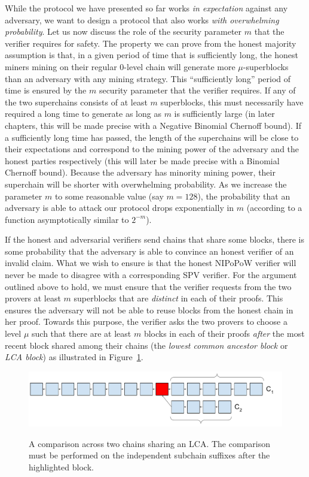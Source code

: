 While the protocol we have presented so far works \emph{in expectation} against
any adversary, we want to design a protocol that also works \emph{with
overwhelming probability}.  Let us now discuss the role of the security
parameter $m$ that the verifier requires for safety. The property we can prove
from the honest majority assumption is that, in a given period of time that is
sufficiently long, the honest miners mining on their regular $0$-level chain
will generate more $\mu$-superblocks than an adversary with any mining strategy.
This ``sufficiently long'' period of time is ensured by the $m$ security
parameter that the verifier requires. If any of the two superchains consists of
at least $m$ superblocks, this must necessarily have required a long time to
generate as long as $m$ is sufficiently large (in later chapters, this will be
made precise with a Negative Binomial Chernoff bound). If a sufficiently long
time has passed, the length of the superchains will be close to their
expectations and correspond to the mining power of the adversary and the honest
parties respectively (this will later be made precise with a Binomial Chernoff
bound). Because the adversary has minority mining power, their superchain will
be shorter with overwhelming probability. As we increase the parameter $m$ to
some reasonable value (say $m = 128$), the probability that an adversary is able
to attack our protocol drops exponentially in $m$ (according to a function
asymptotically similar to $2^{-m}$).

If the honest and adversarial verifiers send chains that share some blocks,
there is some probability that the adversary is able to convince an honest
verifier of an invalid claim. What we wish to ensure is that the honest NIPoPoW
verifier will never be made to disagree with a corresponding SPV verifier. For
the argument outlined above to hold, we must ensure that the verifier requests
from the two provers at least $m$ superblocks that are \emph{distinct} in each
of their proofs. This ensures the adversary will not be able to reuse blocks
from the honest chain in her proof. Towards this purpose, the verifier asks the
two provers to choose a level $\mu$ such that there are at least $m$ blocks in
each of their proofs \emph{after} the most recent block shared among their
chains (the \emph{lowest common ancestor block} or \emph{LCA block}) as
illustrated in Figure~\ref{fig.lca-comparison}.

\begin{figure}[ht]
    \caption{A comparison across two chains sharing an LCA. The comparison must
    be performed on the independent subchain suffixes after the highlighted block.}
    \centering
    \includegraphics[width=0.9\columnwidth,keepaspectratio]{chapters/introduction/figures/lca-comparison.pdf}
    \label{fig.lca-comparison}
\end{figure}

